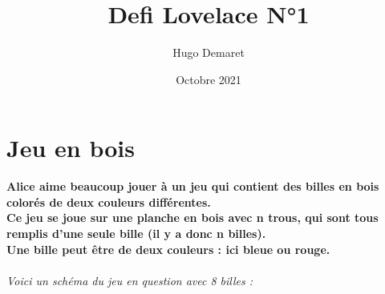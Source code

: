 \documentclass{exam}
\title{Defi Lovelace N°1}
\author{Hugo Demaret}
\date{Octobre 2021}
\begin{document}
\maketitle
    \section*{Jeu en bois}
        \textbf{Alice aime beaucoup jouer à un jeu qui contient des billes en bois colorés de deux couleurs différentes.}\\
        \textbf{Ce jeu se joue sur une planche en bois avec n trous, qui sont tous remplis d'une seule bille (il y a donc n billes). \\Une bille peut être de deux couleurs : ici bleue ou rouge.}\\\\
        \textit{Voici un schéma du jeu en question avec 8 billes :}
\end{document}
